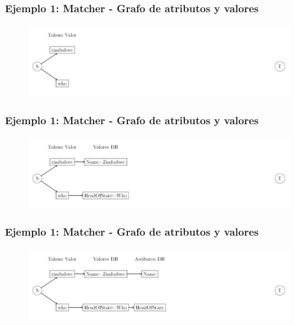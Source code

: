 \begin{frame}
\frametitle{Ejemplo 1: Matcher - Grafo de atributos y valores}
\begin{figure}
  \centering
    \includegraphics[scale=.33]{graficos/presentacion/ejemplo-grafo-matcher-1-3}
\end{figure}
\end{frame}

\begin{frame}
\frametitle{Ejemplo 1: Matcher - Grafo de atributos y valores}
\begin{figure}
  \centering
    \includegraphics[scale=.33]{graficos/presentacion/ejemplo-grafo-matcher-1-4}
\end{figure}
\end{frame}

\begin{frame}
\frametitle{Ejemplo 1: Matcher - Grafo de atributos y valores}
\begin{figure}
  \centering
    \includegraphics[scale=.33]{graficos/presentacion/ejemplo-grafo-matcher-1-5}
\end{figure}
\end{frame}

